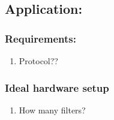 \subsection{Application: }

\subsubsection{Requirements:}
\begin{enumerate}
    \item Protocol??
\end{enumerate}

\subsubsection{Ideal hardware setup}
\begin{enumerate}
    \item How many filters?
\end{enumerate}



